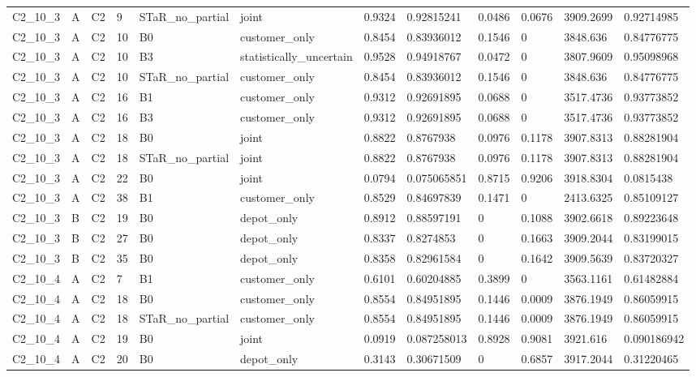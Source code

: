 \begin{longtable}{llllllllllll}
C2\_10\_3 & A & C2 & 9 & STaR\_no\_partial & joint & 0.9324 & 0.92815241 & 0.0486 & 0.0676 & 3909.2699 & 0.92714985 \\
C2\_10\_3 & A & C2 & 10 & B0 & customer\_only & 0.8454 & 0.83936012 & 0.1546 & 0 & 3848.636 & 0.84776775 \\
C2\_10\_3 & A & C2 & 10 & B3 & statistically\_uncertain & 0.9528 & 0.94918767 & 0.0472 & 0 & 3807.9609 & 0.95098968 \\
C2\_10\_3 & A & C2 & 10 & STaR\_no\_partial & customer\_only & 0.8454 & 0.83936012 & 0.1546 & 0 & 3848.636 & 0.84776775 \\
C2\_10\_3 & A & C2 & 16 & B1 & customer\_only & 0.9312 & 0.92691895 & 0.0688 & 0 & 3517.4736 & 0.93773852 \\
C2\_10\_3 & A & C2 & 16 & B3 & customer\_only & 0.9312 & 0.92691895 & 0.0688 & 0 & 3517.4736 & 0.93773852 \\
C2\_10\_3 & A & C2 & 18 & B0 & joint & 0.8822 & 0.8767938 & 0.0976 & 0.1178 & 3907.8313 & 0.88281904 \\
C2\_10\_3 & A & C2 & 18 & STaR\_no\_partial & joint & 0.8822 & 0.8767938 & 0.0976 & 0.1178 & 3907.8313 & 0.88281904 \\
C2\_10\_3 & A & C2 & 22 & B0 & joint & 0.0794 & 0.075065851 & 0.8715 & 0.9206 & 3918.8304 & 0.0815438 \\
C2\_10\_3 & A & C2 & 38 & B1 & customer\_only & 0.8529 & 0.84697839 & 0.1471 & 0 & 2413.6325 & 0.85109127 \\
C2\_10\_3 & B & C2 & 19 & B0 & depot\_only & 0.8912 & 0.88597191 & 0 & 0.1088 & 3902.6618 & 0.89223648 \\
C2\_10\_3 & B & C2 & 27 & B0 & depot\_only & 0.8337 & 0.8274853 & 0 & 0.1663 & 3909.2044 & 0.83199015 \\
C2\_10\_3 & B & C2 & 35 & B0 & depot\_only & 0.8358 & 0.82961584 & 0 & 0.1642 & 3909.5639 & 0.83720327 \\
C2\_10\_4 & A & C2 & 7 & B1 & customer\_only & 0.6101 & 0.60204885 & 0.3899 & 0 & 3563.1161 & 0.61482884 \\
C2\_10\_4 & A & C2 & 18 & B0 & customer\_only & 0.8554 & 0.84951895 & 0.1446 & 0.0009 & 3876.1949 & 0.86059915 \\
C2\_10\_4 & A & C2 & 18 & STaR\_no\_partial & customer\_only & 0.8554 & 0.84951895 & 0.1446 & 0.0009 & 3876.1949 & 0.86059915 \\
C2\_10\_4 & A & C2 & 19 & B0 & joint & 0.0919 & 0.087258013 & 0.8928 & 0.9081 & 3921.616 & 0.090186942 \\
C2\_10\_4 & A & C2 & 20 & B0 & depot\_only & 0.3143 & 0.30671509 & 0 & 0.6857 & 3917.2044 & 0.31220465 \\

\end{longtable}
